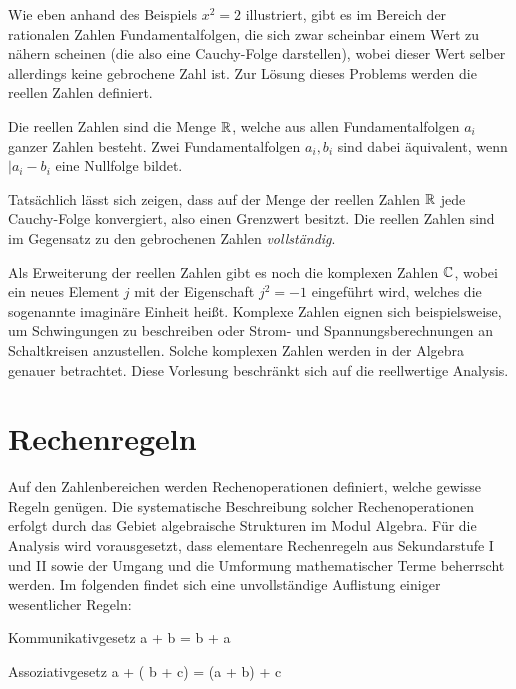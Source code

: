 Wie eben anhand des Beispiels $x^2=2$ illustriert, gibt es im Bereich der rationalen Zahlen Fundamentalfolgen, die sich zwar scheinbar einem Wert zu nähern scheinen (die also eine Cauchy-Folge darstellen),
wobei dieser Wert selber allerdings keine gebrochene Zahl ist. Zur Lösung dieses Problems werden die reellen Zahlen definiert.

\begin{definition}
	Die reellen Zahlen sind die Menge $\mathbb{R}$, welche aus allen Fundamentalfolgen $a_i$ ganzer Zahlen besteht. Zwei Fundamentalfolgen $a_i, b_i$ sind dabei äquivalent, wenn $|a_i-b_i$ eine Nullfolge bildet.
\end{definition}

Tatsächlich lässt sich zeigen, dass auf der Menge der reellen Zahlen $\mathbb{R}$ jede Cauchy-Folge konvergiert, also einen Grenzwert besitzt. Die reellen Zahlen sind im Gegensatz zu den gebrochenen Zahlen \emph{vollständig}.

Als Erweiterung der reellen Zahlen gibt es noch die komplexen Zahlen $\mathbb{C}$, wobei ein neues Element $j$ mit der Eigenschaft $j^2=-1$ eingeführt wird, welches die sogenannte imaginäre Einheit heißt. Komplexe
Zahlen eignen sich beispielsweise, um Schwingungen zu beschreiben oder Strom- und Spannungsberechnungen an Schaltkreisen anzustellen. Solche komplexen Zahlen werden in der Algebra genauer betrachtet. Diese Vorlesung beschränkt sich auf die reellwertige Analysis. 

\section{Rechenregeln}

Auf den Zahlenbereichen werden Rechenoperationen definiert, welche gewisse Regeln genügen. Die systematische Beschreibung solcher Rechenoperationen erfolgt durch das Gebiet algebraische Strukturen im Modul Algebra. Für die Analysis wird vorausgesetzt, dass elementare Rechenregeln aus Sekundarstufe I und II sowie der Umgang und die Umformung mathematischer Terme beherrscht werden. Im folgenden findet sich eine unvollständige Auflistung einiger wesentlicher Regeln: 

\begin{Nequation}{Kommunikativgesetz}
	a + b = b + a
	\label{eq:Kommunikativgesetz}
\end{Nequation}

\begin{Nequation}{Assoziativgesetz}
	a + ( b + c) = (a + b) + c
	\label{eq:Assoziativgesetz}
\end{Nequation}


